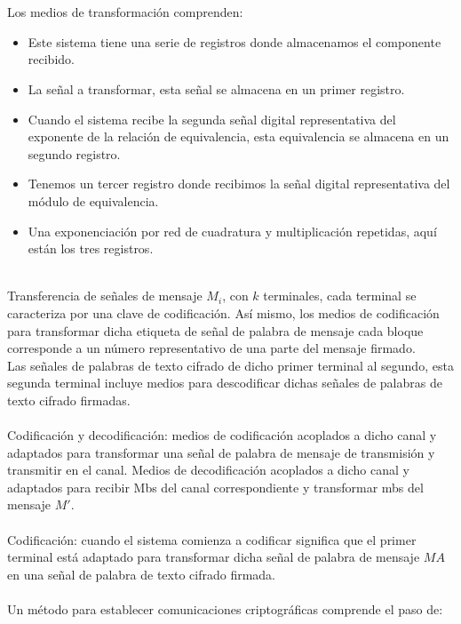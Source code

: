 \documentclass[12pt, a4paper]{article}
\begin{document}
	\\
	\\Los medios de transformación comprenden:
	\begin{itemize}
		\item Este sistema tiene una serie de registros donde almacenamos el componente recibido.
		\item La señal a transformar, esta señal se almacena en un primer registro.
		\item Cuando el sistema recibe la segunda señal digital representativa del exponente de la relación de equivalencia, esta equivalencia se almacena en un segundo registro.
		\item Tenemos un tercer registro donde recibimos la señal digital representativa del módulo de equivalencia.
		\item Una exponenciación por red de cuadratura y multiplicación repetidas, aquí están los tres 	registros.
	\end{itemize}
	\\Transferencia de señales de mensaje $M_{i}$, con $k$ terminales, cada terminal se caracteriza por una clave de codificación. Así mismo, los medios de codificación para transformar dicha etiqueta de señal de palabra de mensaje cada bloque corresponde a un número representativo de una parte del mensaje firmado.
	\\Las señales de palabras de texto cifrado de dicho primer terminal al segundo, esta segunda terminal incluye medios para descodificar dichas señales de palabras de texto cifrado firmadas.
	\\
	\\Codificación y decodificación: medios de codificación acoplados a dicho canal y adaptados para transformar una señal de palabra de mensaje de transmisión y transmitir en el canal. Medios de decodificación acoplados a dicho canal y adaptados para recibir Mbs del canal correspondiente y transformar mbs del mensaje $M'$.
	\\
	\\Codificación: cuando el sistema comienza a codificar significa que el primer terminal está adaptado para transformar dicha señal de palabra de mensaje $MA$ en una señal de palabra de texto cifrado firmada.
	\\
	\\Un método para establecer comunicaciones criptográficas comprende el paso de:
\end{document}
